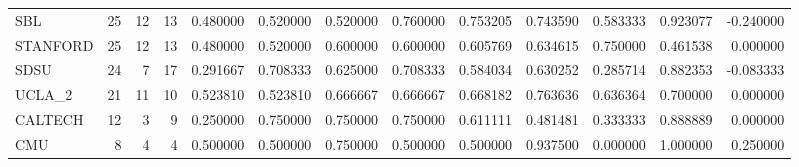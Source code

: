 \begin{table}
\begin{tabular}{lrrrrrrrrrrrr}
SBL & 25 & 12 & 13 & 0.480000 & 0.520000 & 0.520000 & 0.760000 & 0.753205 & 0.743590 & 0.583333 & 0.923077 & -0.240000 \\
STANFORD & 25 & 12 & 13 & 0.480000 & 0.520000 & 0.600000 & 0.600000 & 0.605769 & 0.634615 & 0.750000 & 0.461538 & 0.000000 \\
SDSU & 24 & 7 & 17 & 0.291667 & 0.708333 & 0.625000 & 0.708333 & 0.584034 & 0.630252 & 0.285714 & 0.882353 & -0.083333 \\
UCLA_2 & 21 & 11 & 10 & 0.523810 & 0.523810 & 0.666667 & 0.666667 & 0.668182 & 0.763636 & 0.636364 & 0.700000 & 0.000000 \\
CALTECH & 12 & 3 & 9 & 0.250000 & 0.750000 & 0.750000 & 0.750000 & 0.611111 & 0.481481 & 0.333333 & 0.888889 & 0.000000 \\
CMU & 8 & 4 & 4 & 0.500000 & 0.500000 & 0.750000 & 0.500000 & 0.500000 & 0.937500 & 0.000000 & 1.000000 & 0.250000 \\
\bottomrule
\end{tabular}
\end{table}
